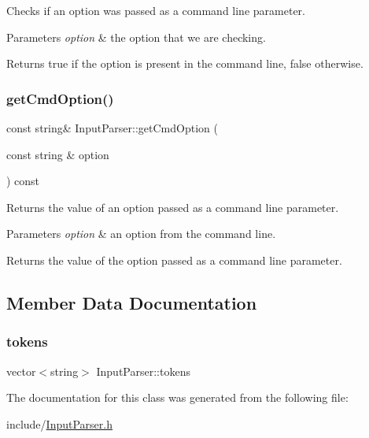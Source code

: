 Checks if an option was passed as a command line parameter. 
\begin{DoxyParams}{Parameters}
{\em option} & the option that we are checking. \\
\hline
\end{DoxyParams}
\begin{DoxyReturn}{Returns}
true if the option is present in the command line, false otherwise. 
\end{DoxyReturn}
\mbox{\label{class_input_parser_aac05d7ad7794084907a0b57ab3e7d607}} 
\subsubsection{\texorpdfstring{get\+Cmd\+Option()}{getCmdOption()}}
{\footnotesize\ttfamily const string\& Input\+Parser\+::get\+Cmd\+Option (\begin{DoxyParamCaption}\item[{const string \&}]{option }\end{DoxyParamCaption}) const}

Returns the value of an option passed as a command line parameter. 
\begin{DoxyParams}{Parameters}
{\em option} & an option from the command line. \\
\hline
\end{DoxyParams}
\begin{DoxyReturn}{Returns}
the value of the option passed as a command line parameter. 
\end{DoxyReturn}


\subsection{Member Data Documentation}
\mbox{\label{class_input_parser_a4bd1105d6fc64bd0e825dc2e34515d75}} 
\subsubsection{\texorpdfstring{tokens}{tokens}}
{\footnotesize\ttfamily vector$<$string$>$ Input\+Parser\+::tokens\hspace{0.3cm}{\ttfamily [private]}}



The documentation for this class was generated from the following file\+:\begin{DoxyCompactItemize}
\item 
include/\hyperlink{_input_parser_8h}{Input\+Parser.\+h}\end{DoxyCompactItemize}
